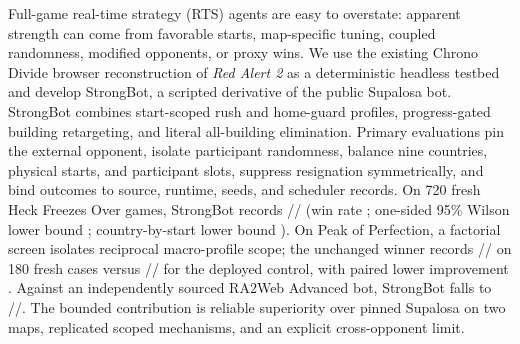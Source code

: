 Full-game real-time strategy (RTS) agents are easy to overstate:
apparent strength can come from favorable starts, map-specific tuning, coupled
randomness, modified opponents, or proxy wins. We use the existing Chrono
Divide browser reconstruction of \emph{Red Alert 2} as a deterministic headless
testbed and develop StrongBot, a scripted derivative of the public Supalosa
bot. StrongBot combines start-scoped rush and home-guard profiles,
progress-gated building retargeting, and literal all-building elimination.
Primary evaluations pin the external opponent, isolate participant randomness,
balance nine countries, physical starts, and participant slots, suppress
resignation symmetrically, and bind outcomes to source, runtime, seeds, and
scheduler records. On 720 fresh Heck Freezes Over games, StrongBot records
\HfoWins{}/\HfoDraws{}/\HfoLosses{} (win rate \HfoWinRate{}; one-sided 95\%
Wilson lower bound \HfoWilsonLower{}; country-by-start lower bound
\HfoClusterLower{}). On Peak of Perfection, a factorial screen isolates
reciprocal macro-profile scope; the unchanged winner records
\PeakWins{}/\PeakDraws{}/\PeakLosses{} on 180 fresh cases versus
\PeakControlWins{}/\PeakControlDraws{}/\PeakControlLosses{} for the deployed
control, with paired lower improvement \PeakPairedLower{}. Against an
independently sourced RA2Web Advanced bot, StrongBot falls to
\AdvancedStrongWins{}/\AdvancedStrongDraws{}/\AdvancedStrongLosses{}. The
bounded contribution is reliable superiority over pinned Supalosa on two maps,
replicated scoped mechanisms, and an explicit cross-opponent limit.
